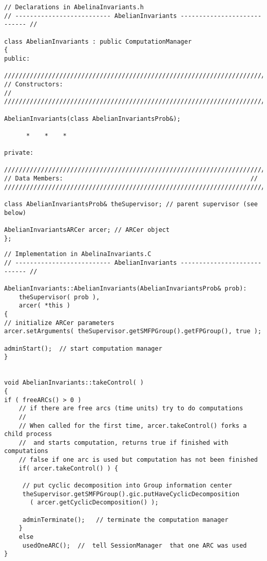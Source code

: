 \documentclass[12pt]{article}
\begin{document}
\footnotesize
\begin{verbatim}
// Declarations in AbelinaInvariants.h
// -------------------------- AbelianInvariants ---------------------------- //

class AbelianInvariants : public ComputationManager
{
public:

/////////////////////////////////////////////////////////////////////////
// Constructors:                                                      //
/////////////////////////////////////////////////////////////////////////

AbelianInvariants(class AbelianInvariantsProb&);

      *    *    *

private:

/////////////////////////////////////////////////////////////////////////
// Data Members:                                                   //
/////////////////////////////////////////////////////////////////////////

class AbelianInvariantsProb& theSupervisor; // parent supervisor (see below)

AbelianInvariantsARCer arcer; // ARCer object
};
\end{verbatim}
\normalsize

\scriptsize
\begin{verbatim}
// Implementation in AbelinaInvariants.C
// -------------------------- AbelianInvariants ---------------------------- //

AbelianInvariants::AbelianInvariants(AbelianInvariantsProb& prob):
    theSupervisor( prob ),
    arcer( *this )
{
// initialize ARCer parameters
arcer.setArguments( theSupervisor.getSMFPGroup().getFPGroup(), true );

adminStart();  // start computation manager
}


void AbelianInvariants::takeControl( )
{
if ( freeARCs() > 0 )    
    // if there are free arcs (time units) try to do computations
    //
    // When called for the first time, arcer.takeControl() forks a child process
    //  and starts computation, returns true if finished with computations
    // false if one arc is used but computation has not been finished
    if( arcer.takeControl() ) {

     // put cyclic decomposition into Group information center
     theSupervisor.getSMFPGroup().gic.putHaveCyclicDecomposition
       ( arcer.getCyclicDecomposition() );

     adminTerminate();   // terminate the computation manager
    }
    else
     usedOneARC();  //  tell SessionManager  that one ARC was used
}

\end{verbatim}
\normalsize
\end{document}
